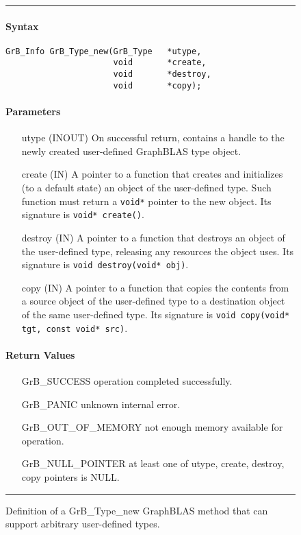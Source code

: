 \begin{figure}
\hrule
\footnotesize
\paragraph{Syntax}

\begin{verbatim}
GrB_Info GrB_Type_new(GrB_Type   *utype,
                      void       *create,
                      void       *destroy,
                      void       *copy);
\end{verbatim}

\paragraph{Parameters}

\begin{itemize}[leftmargin=0.6in]
\item[{\sf utype}] ({\sf INOUT}) On successful return, contains a handle to the newly created user-defined GraphBLAS type object.
\item[{\sf create}] ({\sf IN})    A pointer to a function that creates and initializes (to a default state) an object of the user-defined type. Such function must return a {\tt void*} pointer to the new object. Its signature is \verb|void* create()|.
\item[{\sf destroy}] ({\sf IN}) A pointer to a function that destroys an object of the user-defined type, releasing any resources the object uses. Its signature is \verb|void destroy(void* obj)|.
\item[{\sf copy}] ({\sf IN}) A pointer to a function that copies the contents from a source object of the user-defined type to a destination object of the same user-defined type. Its signature is \verb|void copy(void* tgt, const void* src)|.
\end{itemize}

\paragraph{Return Values}

\begin{itemize}[leftmargin=1.6in]
\item[{\sf GrB\_SUCCESS}]           operation completed successfully.
\item[{\sf GrB\_PANIC}]             unknown internal error.
\item[{\sf GrB\_OUT\_OF\_MEMORY}]          not enough memory available for operation.
\item[{\sf GrB\_NULL\_POINTER}]    at least one of {\sf utype}, {\sf create}, {\sf destroy}, {\sf copy} pointers is {\sf NULL}.
\end{itemize}

	\caption{Definition of a {\sf GrB\_Type\_new} GraphBLAS method that can support arbitrary user-defined types.}
	\label{Fig:GrB_Type_new}
\hrule
\end{figure}
